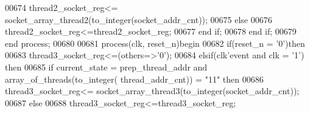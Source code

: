 \begin{DoxyCode}
00674             \textcolor{vhdlchar}{thread2_socket_reg}\textcolor{vhdlchar}{<=} \textcolor{vhdlchar}{socket_array_thread2}\textcolor{vhdlchar}{(}\textcolor{vhdlchar}{to\_integer}\textcolor{vhdlchar}{(}\textcolor{vhdlchar}{socket_addr_cnt}\textcolor{vhdlchar}{)}\textcolor{vhdlchar}{)};
00675         \textcolor{keywordflow}{else} 
00676             \textcolor{vhdlchar}{thread2_socket_reg}\textcolor{vhdlchar}{<=}\textcolor{vhdlchar}{thread2_socket_reg};
00677         \textcolor{keywordflow}{end} \textcolor{keywordflow}{if};
00678     \textcolor{keywordflow}{end} \textcolor{keywordflow}{if}; 
00679 \textcolor{keywordflow}{end} \textcolor{keywordflow}{process};
00680 
00681 \textcolor{keywordflow}{process}(clk, reset_n)\textcolor{keywordflow}{begin}
00682     \textcolor{keywordflow}{if}\textcolor{vhdlchar}{(}\textcolor{vhdlchar}{reset_n} \textcolor{vhdlchar}{=} \textcolor{vhdlchar}{'}\textcolor{vhdllogic}{}\textcolor{vhdllogic}{0}\textcolor{vhdlchar}{'}\textcolor{vhdlchar}{)}\textcolor{keywordflow}{then} 
00683         \textcolor{vhdlchar}{thread3_socket_reg}\textcolor{vhdlchar}{<=}\textcolor{vhdlchar}{(}\textcolor{keywordflow}{others}\textcolor{vhdlchar}{=}\textcolor{vhdlchar}{>}\textcolor{vhdlchar}{'}\textcolor{vhdllogic}{}\textcolor{vhdllogic}{0}\textcolor{vhdlchar}{'}\textcolor{vhdlchar}{)};
00684     \textcolor{keywordflow}{elsif}\textcolor{vhdlchar}{(}\textcolor{vhdlchar}{clk}\textcolor{vhdlchar}{'}\textcolor{vhdlkeyword}{event} \textcolor{keywordflow}{and} \textcolor{vhdlchar}{clk} \textcolor{vhdlchar}{=} \textcolor{vhdlchar}{'}\textcolor{vhdllogic}{}\textcolor{vhdllogic}{1}\textcolor{vhdlchar}{'}\textcolor{vhdlchar}{)} \textcolor{keywordflow}{then}
00685         \textcolor{keywordflow}{if} \textcolor{vhdlchar}{current_state} \textcolor{vhdlchar}{=} \textcolor{vhdlchar}{prep\_thread\_addr} \textcolor{keywordflow}{and} \textcolor{vhdlchar}{array_of_threads}\textcolor{vhdlchar}{(}\textcolor{vhdlchar}{to\_integer}\textcolor{vhdlchar}{(}\textcolor{vhdlchar}{
      thread_addr_cnt}\textcolor{vhdlchar}{)}\textcolor{vhdlchar}{)} \textcolor{vhdlchar}{=} \textcolor{vhdllogic}{"11"} \textcolor{keywordflow}{then} 
00686             \textcolor{vhdlchar}{thread3_socket_reg}\textcolor{vhdlchar}{<=} \textcolor{vhdlchar}{socket_array_thread3}\textcolor{vhdlchar}{(}\textcolor{vhdlchar}{to\_integer}\textcolor{vhdlchar}{(}\textcolor{vhdlchar}{socket_addr_cnt}\textcolor{vhdlchar}{)}\textcolor{vhdlchar}{)};
00687         \textcolor{keywordflow}{else} 
00688             \textcolor{vhdlchar}{thread3_socket_reg}\textcolor{vhdlchar}{<=}\textcolor{vhdlchar}{thread3_socket_reg};

\end{DoxyCode}
